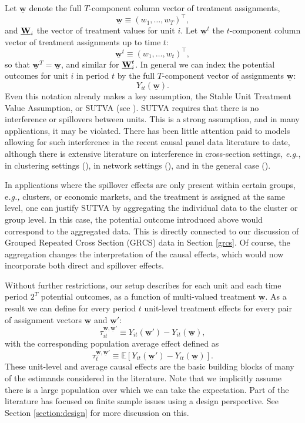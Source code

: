 \documentclass[letterpaper,12pt,leqno]{article}
\newcommand{\ubw}{\underline{{\bf W}}}
\newcommand{\ubww}{\underline{\mathbf{w}}}
\newcommand{\mme}{{\mathbb{E}}}
\begin{document}
Let $\ubww$ denote the full $T$-component column vector of treatment assignments,
\[ \ubww\equiv (w_1,\ldots,w_T)^\top,\]
and $\ubw_i$ the vector of treatment values for unit $i$. Let
 $\ubww^t$ the $t$-component column vector of treatment assignments up to time $t$:
\[ \ubww^t\equiv (w_1,\ldots,w_t)^\top,\]
so that $\ubww^T=\ubww$, and similar for $\ubw^t_i$.
In general we can index the potential outcomes for unit $i$ in period $t$ by the full $T$-component vector of assignments $\ubww$:
\[ Y_{it}(\ubww).\]
Even this notation already makes a key assumption, the Stable Unit Treatment Value Assumption, or SUTVA (see \citealp{rubin1978bayesian, imbens2015causal}). SUTVA requires that there is no interference or spillovers between units. This is a strong assumption, and in many applications, it may be violated. There has been little attention paid to models allowing for such interference in the recent causal panel data literature to date, although there is extensive literature on interference in cross-section settings, {\it e.g.}, in clustering settings (\citealp{hudgens, manski1993}), in network settings (\citealp{leung2023network, auerbach2022identification}), and in the general case (\citealp{aronow2017estimating}). 

In applications where the spillover effects are only present within certain groups, e{\it .g.,} clusters, or economic markets, and the treatment is assigned at the same level, one can justify SUTVA by aggregating the individual data to the cluster or group level. In this case, the potential outcome introduced above would correspond to the aggregated data. This is directly connected to our discussion of Grouped Repeated Cross Section (GRCS) data in Section \ref{grcs}. Of course, the aggregation changes the interpretation of the causal effects, which would now incorporate both direct and spillover effects.  

Without further restrictions, our setup describes for each unit and each time period $2^T$ potential outcomes, as a function of multi-valued treatment $\ubww$. As a result we can define for every period $t$  unit-level treatment effects for every pair of assignment vectors $\ubww$ and $\ubww'$:
\begin{equation}\label{eq:estimand_general}
\tau^{\ubww,\ubww'}_{it}\equiv Y_{it}(\ubww') -Y_{it}(\ubww),
    \end{equation}
with the corresponding population average effect defined as
\[\tau^{\ubww,\ubww'}_{t}\equiv\mme\left[ Y_{it}(\ubww') -Y_{it}(\ubww)\right].
\]
These unit-level and average causal effects are the basic building blocks of many of the estimands considered in the literature. 
Note that we implicitly assume there is a large population over which we can take the expectation. Part of the literature has focused on finite sample issues using a design perspective. See Section  \ref{section:design} for more discussion on this.
\end{document}
